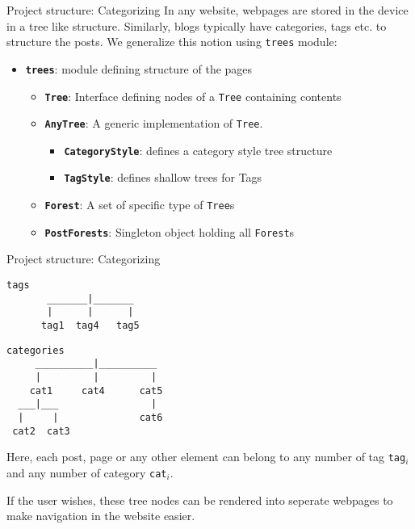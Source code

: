 \documentclass[compress, aspectratio=169]{beamer}
\renewcommand{\imp}[1]{\texttt{\textbf{#1}}}
\begin{document}
\begin{frame}{Project structure: Categorizing}
    In any website, webpages are stored in the device in a tree like structure.
    Similarly, blogs typically have categories, tags etc. to structure the posts. We
    generalize this notion using \texttt{trees} module:
    \begin{itemize}[<+->]
        \item \imp{trees}: module defining structure of the pages
            \begin{itemize}
                \item \imp{Tree}: Interface defining nodes of a \texttt{Tree} containing
                    contents
                \item \imp{AnyTree}: A generic implementation of \texttt{Tree}.
                    \begin{itemize}
                        \item \imp{CategoryStyle}: defines a category style tree
                            structure
                        \item \imp{TagStyle}: defines shallow trees for Tags
                    \end{itemize}
                \item \imp{Forest}: A set of specific type of \texttt{Tree}s
                \item \imp{PostForests}: Singleton object holding all \texttt{Forest}s
            \end{itemize}
    \end{itemize}
\end{frame}

\begin{frame}[fragile]{Project structure: Categorizing}
    \begin{minipage}[t]{.48\linewidth}
\begin{lstlisting}[style=fonts]
             tags
       _______|_______
       |      |      |
      tag1  tag4   tag5
\end{lstlisting}
    \end{minipage}\hfill%
    \begin{minipage}[t]{.48\linewidth}
\begin{lstlisting}[style=fonts]
           categories
     __________|__________
     |         |         |
    cat1     cat4      cat5
  ___|___                |      
  |     |              cat6 
 cat2  cat3 
\end{lstlisting}
    \end{minipage}
    
    Here, each post, page or any other element can belong to any number of tag
    \texttt{tag}\(_{i}\) and any number of category \texttt{cat}\(_{i}\).
    \pause

    If the user wishes, these tree nodes can be rendered into seperate webpages to make
    navigation in the website easier.
\end{frame}
\end{document}
